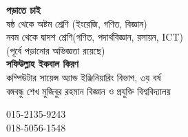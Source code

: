 \documentclass[6pt, serif]{beamer}
\begin{document}
\frame
{
\begin{center}
	{\Huge \textbf{পড়াতে চাই}}\\
	\vspace{12pt}
	ষষ্ঠ থেকে অষ্টম শ্রেণি \hspace{4 pt}(ইংরেজি, গণিত, বিজ্ঞান)\\
	নবম থেকে দ্বাদশ শ্রেণি\hspace{4 pt}(গণিত, পদার্থবিজ্ঞান, রসায়ন, ICT)\\
	\footnotesize{(পূর্বে পড়ানোর অভিজ্ঞতা রয়েছে)} \\
	\vspace{8 pt}
	\textbf{{\Large সফিউল্লাহ ইকবাল কিরণ}} \\
	{\small কম্পিউটার সায়েন্স অ্যান্ড ইঞ্জিনিয়ারিং বিভাগ, ৩য় বর্ষ \\ বঙ্গবন্ধু শেখ মুজিবুর রহমান বিজ্ঞান ও প্রযুক্তি বিশ্ববিদ্যালয়}\\
	\vspace{3 pt}
	\begin{tcolorbox}[title=যোগাযোগ, width=110pt]
		\faPhoneSquare \hspace{2 pt} 015-2135-9243 \\
		\faPhoneSquare \hspace{2 pt} 018-5056-1548
	\end{tcolorbox}
\end{center}
}
\end{document}
